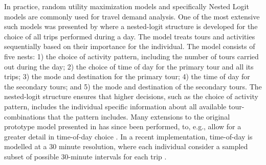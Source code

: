 In practice, random utility maximization models and specifically Nested Logit models are commonly used for travel demand analysis. One of the most extensive such models was presented by \citet{Bowman01} where a nested-logit structure is developed for the choice of all trips performed during a day. The model treats tours and activities sequentially based on their importance for the individual. The model consists of five nests: 1) the choice of activity pattern, including the number of tours carried out during the day; 2) the choice of time of day for the primary tour and all its trips; 3) the mode and destination for the primary tour; 4) the time of day for the secondary tours; and 5) the mode and destination of the secondary tours. The nested-logit structure ensures that higher decisions, such as the choice of activity pattern, includes the individual specific information about all available tour-combinations that the pattern includes. Many extensions to the original prototype model presented in \citet{Bowman01} has since been performed, to, e.g., allow for a greater detail in time-of-day choice \citep{Vovsha04}. In a recent implementation, time-of-day is modelled at a 30 minute resolution, where each individual consider a sampled subset of possible 30-minute intervals for each trip \citep{Bradley10}.


